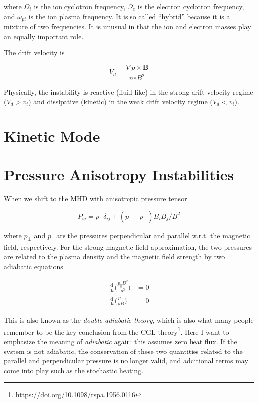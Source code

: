 \documentclass[
  notoc %
]{tufte-book}
\DeclareRobustCommand{\href}[2]{#2\footnote{\url{#1}}}
\begin{document}
where \(\Omega_i\) is the ion cyclotron frequency, \(\Omega_e\) is the
electron cyclotron frequency, and \(\omega_{pi}\) is the ion plasma
frequency. It is so called ``hybrid'' because it is a mixture of two
frequencies. It is unusual in that the ion and electron masses play an
equally important role.

The drift velocity is

\[
V_d = \frac{\nabla p\times \mathbf{B}}{neB^2}
\]

Physically, the instability is reactive (fluid-like) in the strong drift
velocity regime (\(V_d > v_i\)) and dissipative (kinetic) in the weak
drift velocity regime (\(V_d < v_i\)).

\hypertarget{kinetic-mode}{%
\section{Kinetic Mode}\label{kinetic-mode}}

\hypertarget{pressure-anisotropy-instabilities}{%
\section{Pressure Anisotropy
Instabilities}\label{pressure-anisotropy-instabilities}}

When we shift to the MHD with anisotropic pressure tensor

\[
P_{ij} = p_\perp \delta_{ij} + (p_\parallel - p_\perp)B_i B_j / B^2
\]

where \(p_\perp\) and \(p_\parallel\) are the pressures perpendicular
and parallel w.r.t. the magnetic field, respectively. For the strong
magnetic field approximation, the two pressures are related to the
plasma density and the magnetic field strength by two adiabatic
equations,

\[
\begin{aligned}
\frac{\mathrm{d}}{\mathrm{d}t}\Big( \frac{p_\parallel B^2}{\rho^3} \Big) &= 0 \\
\frac{\mathrm{d}}{\mathrm{d}t}\Big( \frac{p_\perp}{\rho B} \Big) &= 0
\end{aligned}
\]

This is also known as the \emph{double adiabatic theory}, which is also
what many people remember to be the key conclusion from the
\href{https://doi.org/10.1098/rspa.1956.0116}{CGL theory}. Here I want
to emphasize the meaning of \emph{adiabatic} again: this assumes zero
heat flux. If the system is not adiabatic, the conservation of these two
quantities related to the parallel and perpendicular pressure is no
longer valid, and additional terms may come into play such as the
stochastic heating.
\end{document}

